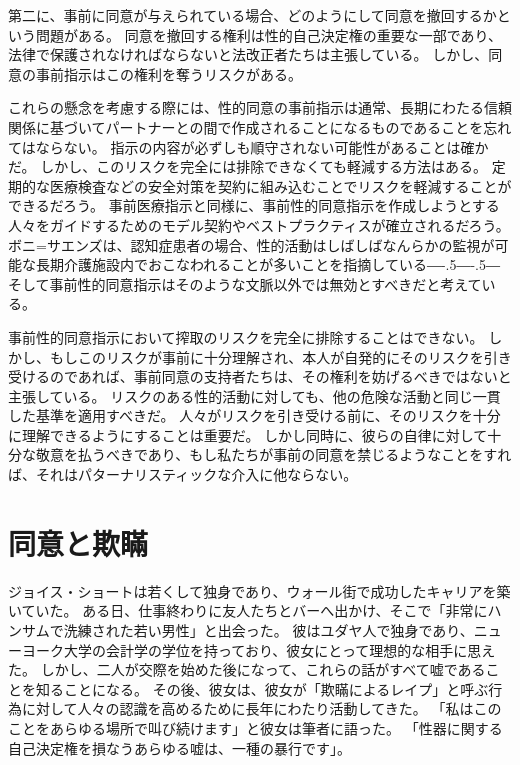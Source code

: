 \documentclass[paper=a4,book,openany]{jlreq}
\def\DDASH{―\kern-.5\zw―\kern-.5\zw―} %
\begin{document}
第二に、事前に同意が与えられている場合、どのようにして同意を撤回するかという問題がある。
同意を撤回する権利は性的自己決定権の重要な一部であり、法律で保護されなければならないと法改正者たちは主張している。
しかし、同意の事前指示はこの権利を奪うリスクがある。

これらの懸念を考慮する際には、性的同意の事前指示は通常、長期にわたる信頼関係に基づいてパートナーとの間で作成されることになるものであることを忘れてはならない。
指示の内容が必ずしも順守されない可能性があることは確かだ。
しかし、このリスクを完全には排除できなくても軽減する方法はある。
定期的な医療検査などの安全対策を契約に組み込むことでリスクを軽減することができるだろう。
事前医療指示と同様に、事前性的同意指示を作成しようとする人々をガイドするためのモデル契約やベストプラクティスが確立されるだろう。
ボニ=サエンズは、認知症患者の場合、性的活動はしばしばなんらかの監視が可能な長期介護施設内でおこなわれることが多いことを指摘している{\DDASH}そして事前性的同意指示はそのような文脈以外では無効とすべきだと考えている\citep[p.43]{boni-saenz15:_sexual_incap}。

事前性的同意指示において搾取のリスクを完全に排除することはできない。
しかし、もしこのリスクが事前に十分理解され、本人が自発的にそのリスクを引き受けるのであれば、事前同意の支持者たちは、その権利を妨げるべきではないと主張している。
リスクのある性的活動に対しても、他の危険な活動と同じ一貫した基準を適用すべきだ。
人々がリスクを引き受ける前に、そのリスクを十分に理解できるようにすることは重要だ。
しかし同時に、彼らの自律に対して十分な敬意を払うべきであり、もし私たちが事前の同意を禁じるようなことをすれば、それはパターナリスティックな介入に他ならない。

\section{同意と欺瞞}

ジョイス・ショートは若くして独身であり、ウォール街で成功したキャリアを築いていた。
ある日、仕事終わりに友人たちとバーへ出かけ、そこで「非常にハンサムで洗練された若い男性」と出会った。
彼はユダヤ人で独身であり、ニューヨーク大学の会計学の学位を持っており、彼女にとって理想的な相手に思えた。
しかし、二人が交際を始めた後になって、これらの話がすべて嘘であることを知ることになる。
その後、彼女は、彼女が「欺瞞によるレイプ」と呼ぶ行為に対して人々の認識を高めるために長年にわたり活動してきた。
「私はこのことをあらゆる場所で叫び続けます」と彼女は筆者に語った。
「性器に関する自己決定権を損なうあらゆる嘘は、一種の暴行です」\citep{mcarthur16:_is_lying_get_laid_form_sexual_assaul}。
\end{document}
